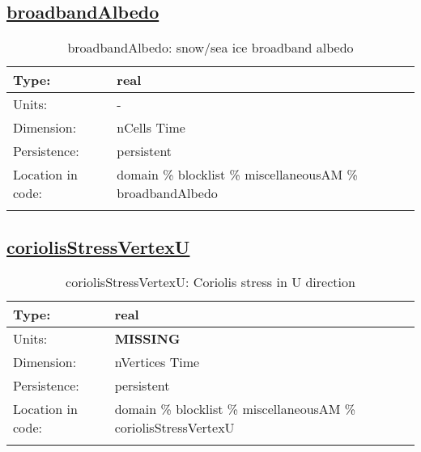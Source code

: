 \subsection[broadbandAlbedo]{\hyperref[sec:var_tab_miscellaneousAM]{broadbandAlbedo}}
\label{subsec:var_sec_miscellaneousAM_broadbandAlbedo}
\begin{center}
\begin{longtable}{| p{2.0in} | p{4.0in} |}
        \hline 
        Type: & real \\
        \hline 
        Units: & \si{-} \\
        \hline 
        Dimension: & nCells Time \\
        \hline 
        Persistence: & persistent \\
        \hline 
         Location in code: & domain \% blocklist \% miscellaneousAM \% broadbandAlbedo \\
         \hline 
    \caption{broadbandAlbedo: snow/sea ice broadband albedo}
\end{longtable}
\end{center}
\subsection[coriolisStressVertexU]{\hyperref[sec:var_tab_miscellaneousAM]{coriolisStressVertexU}}
\label{subsec:var_sec_miscellaneousAM_coriolisStressVertexU}
\begin{center}
\begin{longtable}{| p{2.0in} | p{4.0in} |}
        \hline 
        Type: & real \\
        \hline 
        Units: & {\bf \color{red} MISSING} \\
        \hline 
        Dimension: & nVertices Time \\
        \hline 
        Persistence: & persistent \\
        \hline 
         Location in code: & domain \% blocklist \% miscellaneousAM \% coriolisStressVertexU \\
         \hline 
    \caption{coriolisStressVertexU: Coriolis stress in U direction}
\end{longtable}
\end{center}
